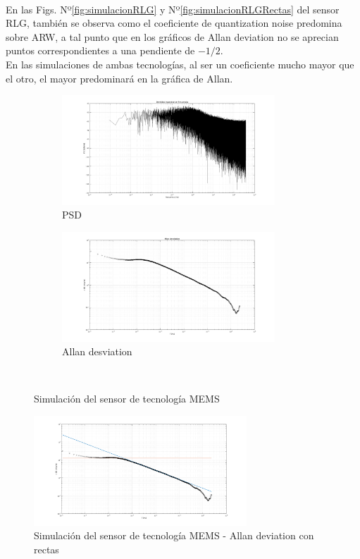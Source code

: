 \documentclass[a4paper,11pt,twoside]{IT-CNEA}
\begin{document}
\\ En las Figs. Nº\ref{fig:simulacionRLG} y Nº\ref{fig:simulacionRLGRectas} del sensor RLG, también se observa como el coeficiente de quantization noise predomina sobre ARW, a tal punto que en los gráficos de Allan deviation no se aprecian puntos correspondientes a una pendiente de $-1/2$. 
\\ En las simulaciones de ambas tecnologías, al ser un coeficiente mucho mayor que el otro, el mayor predominará en la gráfica de Allan.
\begin{figure}[t!]
    \centering
    \begin{subfigure}[t]{0.5\textwidth}
        \centering
        \includegraphics[width=8cm]{Figuras/PSDMEMS.png}
        \caption{PSD}
        \label{fig:}
    \end{subfigure}%
    \begin{subfigure}[t]{0.5\textwidth}
        \centering
        \includegraphics[width=8cm]{Figuras/AllanMEMS.png}
        \caption{Allan desviation}
        \label{fig:}
    \end{subfigure}%
    ~ 
    \caption{Simulación del sensor de tecnología MEMS}
    \label{fig:simulacionMEMs}
\end{figure}
\begin{figure}[h!]
\centering
\includegraphics[width=8cm]{Figuras/AllanMEMSRectas.png}
\caption{Simulación del sensor de tecnología MEMS - Allan deviation con rectas}
\label{fig:simulacionMEMsRectas}
\end{figure}
\end{document}
